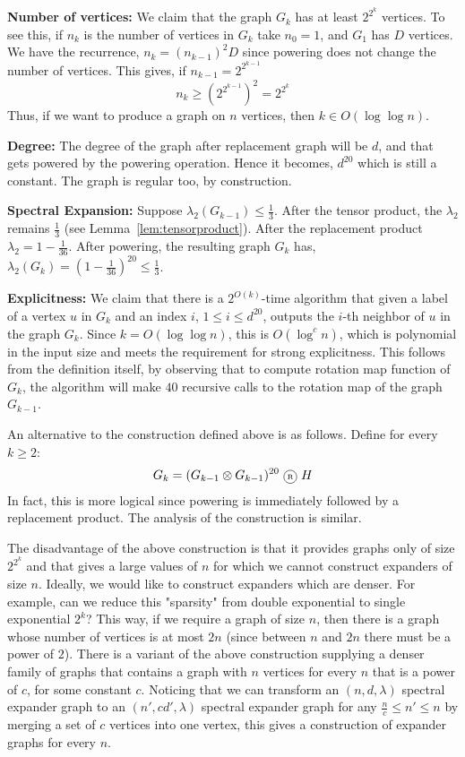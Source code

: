 \begin{description}
\item{\bf Number of vertices:} We claim that the graph $G_k$ has at least $2^{2^k}$ vertices. To see this, if $n_k$ is the number of vertices in $G_k$ take $n_0=1$, and $G_1$ has $D$ vertices. We have the recurrence, $n_k = \left(n_{k-1}\right)^2D$ since powering does not change the number of vertices. This gives, if $n_{k-1} = 2^{2^{k-1}}$
$$n_k \ge \left(2^{2^{k-1}}\right)^2 = 2^{2^k}$$ 
Thus, if we want to produce a graph on $n$ vertices, then $k \in  O(\log \log n)$.
\item{\bf Degree:} The degree of the graph after replacement graph will be $d$, and that gets powered by the powering operation. Hence it becomes, $d^{20}$ which is still a constant. The graph is regular too, by construction.
\item{\bf Spectral Expansion:} Suppose $\lambda_2(G_{k-1}) \le \frac{1}{3}$. After the tensor product, the $\lambda_2$ remains $\frac{1}{3}$ (see Lemma~\ref{lem:tensorproduct}). After the replacement product $\lambda_2 = 1-\frac{1}{36}$. After powering, the resulting graph $G_k$ has, $\lambda_2(G_k) = (1-\frac{1}{36})^{20} \le \frac{1}{3}$.
\item{\bf Explicitness:} We claim that there is a $2^{O(k)}$-time algorithm that given a label of a vertex $u$ in $G_k$ and an index $i$, $1\le i\le d^{20}$,
outputs the $i$-th neighbor of $u$ in the graph $G_k$. Since $k=O(\log \log n)$, this is $O(\log^c n)$, which is polynomial in the input size and meets the requirement for strong explicitness. This follows from the definition itself, by observing that to compute rotation map function of $G_k$, the algorithm will make $40$ recursive calls to the rotation map of the graph $G_{k-1}$.
\end{description}

\noindent An alternative to the construction defined above is as follows. Define for every $k\ge 2$:
$$G_k = (G_{k-1} \otimes G_{k-1})^{20} \circled{R} H$$
In fact, this is more logical since powering is immediately followed by a replacement product. The analysis of the construction is similar.

\begin{remark}
The disadvantage of the above construction is that it provides graphs only of size $2^{2^k}$ and that gives a large values of $n$ for which we cannot construct expanders of size $n$. Ideally, we would like to construct expanders which are denser. For example, can we reduce this "sparsity" from double exponential to single exponential $2^k$? This way, if we require a graph of size $n$, then there is a graph whose number of vertices is at most $2n$ (since between $n$ and $2n$ there must be a power of $2$). There is a variant of the above construction supplying a denser family
of graphs that contains a graph with $n$ vertices for every $n$ that is a power of $c$, for some constant $c$. Noticing that we can transform an $(n,d,\lambda)$ spectral expander graph to an $(n',cd',\lambda)$ spectral expander graph for any $\frac{n}{c} \le n' \le n$ by merging a set of $c$ vertices into one vertex, this gives a construction of expander graphs for every $n$.
\end{remark}
